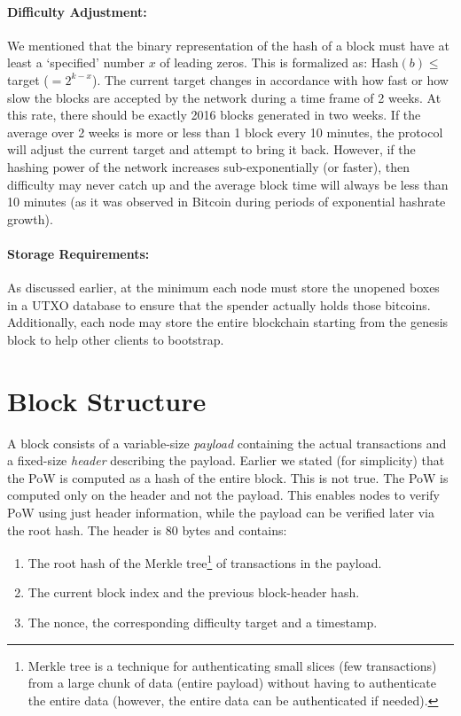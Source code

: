 \documentclass[]{report}   %
\begin{document}
\paragraph{Difficulty Adjustment:} We mentioned that the binary representation of the hash of a block must have at least a `specified' number $x$ of leading zeros. This is formalized as: Hash$(b)\leq $ target ($=2^{k-x}$). The current target changes in accordance with how fast or how slow the blocks are accepted by the network during a time frame of 2 weeks. At this rate, there should be exactly 2016 blocks generated in two weeks. If the average over 2 weeks is more or less than 1 block every 10 minutes, the protocol will adjust the current target and attempt to bring it back. However, if the hashing power of the network increases sub-exponentially (or faster), then difficulty may never catch up and the average block time will always be less than 10 minutes (as it was observed in Bitcoin during periods of exponential hashrate growth). 

\paragraph{Storage Requirements:} As discussed earlier, at the minimum each node must store the unopened boxes in a UTXO database to ensure that the spender actually holds those bitcoins. Additionally, each node may store the entire blockchain starting from the genesis block to help other clients to bootstrap. 

\section{Block Structure} 

A block consists of a variable-size {\em payload} containing the actual transactions and a fixed-size {\em header} describing the payload. 
Earlier we stated (for simplicity) that the PoW is computed as a hash of the entire block. This is not true. The PoW is computed only on the header and not the payload. This enables nodes to verify PoW using just header information, while the payload can be verified later via the root hash. 
The header is 80 bytes and contains: 
\begin{enumerate}
	\item The root hash of the Merkle tree\footnote{Merkle tree is a technique for authenticating small slices (few transactions) from a large chunk of data (entire payload) without having to authenticate the entire data (however, the entire data can be authenticated if needed).} of transactions in the payload.
	\item The current block index and the previous block-header hash.
	\item The nonce, the corresponding difficulty target and a timestamp.
\end{enumerate}
\end{document}
